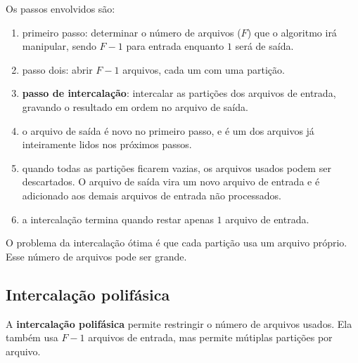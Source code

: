 Os passos envolvidos são:
\begin{enumerate}
\item primeiro passo: determinar o número de arquivos ($F$) que o algoritmo irá
manipular, sendo $F-1$ para entrada enquanto $1$ será de saída.

\item passo dois: abrir $F-1$ arquivos, cada um com uma partição. 

\item {\bf passo de intercalação}: intercalar as partições dos arquivos de entrada,
gravando o resultado em ordem no arquivo de saída.

\item o arquivo de saída é novo no primeiro passo, e é um dos arquivos já
inteiramente lidos nos próximos passos.

\item quando todas as partições ficarem vazias, os arquivos usados podem ser descartados.
O arquivo de saída vira um novo arquivo de entrada e é adicionado aos demais arquivos
de entrada não processados.

\item a intercalação termina quando restar apenas $1$ arquivo de entrada.
\end{enumerate}

O problema da intercalação ótima é que cada partição usa um arquivo próprio.
Esse número de arquivos pode ser grande.

\subsection{Intercalação polifásica}

A {\bf intercalação polifásica} permite restringir o número de arquivos usados.
Ela também usa $F-1$ arquivos de entrada, mas permite mútiplas partições por arquivo.

